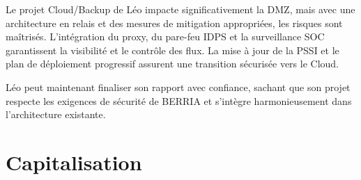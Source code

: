 Le projet Cloud/Backup de Léo impacte significativement la DMZ, mais avec une architecture en relais et des mesures de mitigation appropriées, les risques sont maîtrisés. L'intégration du proxy, du pare-feu IDPS et la surveillance SOC garantissent la visibilité et le contrôle des flux. La mise à jour de la PSSI et le plan de déploiement progressif assurent une transition sécurisée vers le Cloud.

\medskip

\noindent Léo peut maintenant finaliser son rapport avec confiance, sachant que son projet respecte les exigences de sécurité de BERRIA et s'intègre harmonieusement dans l'architecture existante.

\newpage

\section*{Capitalisation}

